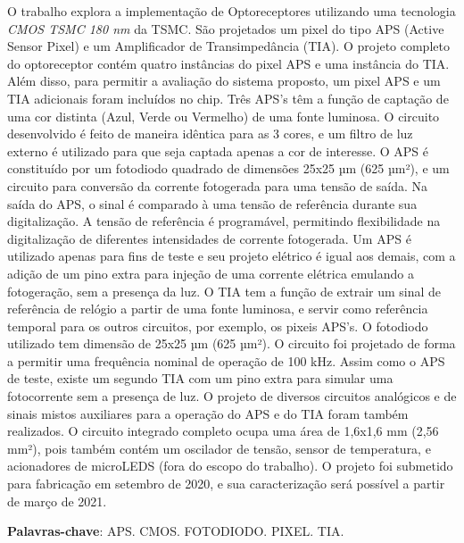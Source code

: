 
\setlength{\absparsep}{18pt} %
\begin{resumo}

O trabalho explora a implementação de Optoreceptores utilizando uma tecnologia \textit{CMOS TSMC 180 nm} da TSMC. São projetados um pixel do tipo APS (Active Sensor Pixel) e um Amplificador de Transimpedância (TIA). O projeto completo do optoreceptor contém quatro instâncias do pixel APS e uma instância do TIA. Além disso, para permitir a avaliação do sistema proposto, um pixel APS e um TIA adicionais foram incluídos no chip. Três APS’s t\^em a função de captação de uma cor distinta (Azul, Verde ou Vermelho) de uma fonte luminosa. O circuito desenvolvido é feito de maneira idêntica para as 3 cores, e um filtro de luz externo é utilizado para que seja captada apenas a cor de interesse. O APS é constituído por um fotodiodo quadrado de dimensões 25x25 µm (625 µm²), e um circuito para conversão da corrente fotogerada para uma tensão de saída. Na saída do APS, o sinal é comparado à uma tensão de referência durante sua digitalização. A tensão de referência é programável, permitindo flexibilidade na digitalização de diferentes intensidades de corrente fotogerada. Um APS é utilizado apenas para fins de teste e seu projeto elétrico é igual aos demais, com a adição de um pino extra para injeção de uma corrente elétrica emulando a fotogeração, sem a presença da luz. O TIA tem a função de extrair um sinal de referência de relógio a partir de uma fonte luminosa, e servir como referência temporal para os outros circuitos, por exemplo, os pixeis APS’s. O fotodiodo utilizado tem dimensão de 25x25 µm (625 µm²). O circuito foi projetado de forma a permitir uma frequência nominal de operação de 100 kHz. Assim como o APS de teste, existe um segundo TIA com um pino extra para simular uma fotocorrente sem a presença de luz. O projeto de diversos circuitos analógicos e de sinais mistos auxiliares para a operação do APS e do TIA foram também realizados. O circuito integrado completo ocupa uma área de 1,6x1,6 mm (2,56 mm²), pois também contém um oscilador de tensão, sensor de temperatura, e acionadores de microLEDS (fora do escopo do trabalho). O projeto foi submetido para fabricação em setembro de 2020, e sua caracterização será possível a partir de março de 2021.

\vspace{\onelineskip}
 
   \noindent 

 \textbf{Palavras-chave}: APS. CMOS. FOTODIODO. PIXEL. TIA.
\end{resumo}